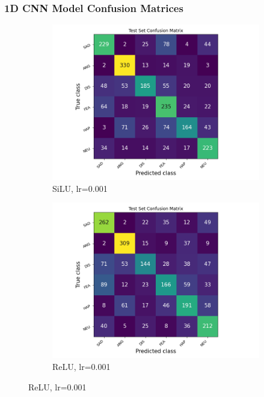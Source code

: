 \subsubsection{1D CNN Model Confusion Matrices}

\begin{figure}[h]
    \centering
    \begin{subfigure}[b]{0.32\textwidth}
        \includegraphics[width=\textwidth]{1D/lr0.001-SiLU-1D-CF.png}
        \caption{SiLU, lr=0.001}
    \end{subfigure}
    \begin{subfigure}[b]{0.32\textwidth}
        \includegraphics[width=\textwidth]{1D/lr0.001-ReLU-1D-CF.png}
        \caption{ReLU, lr=0.001}

\end{subfigure}
\end{figure}

